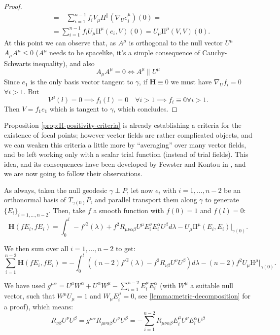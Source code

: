 \begin{proof}
\begin{align*}
		& = - \sum_{i = 1}^{n - 1}f_i V_{\mu}\Pi^{\parallel}\left(\nabla_Ue_i^{\mu}\right)(0) =\\
		& = \sum_{i = 1}^{n - 1}f_i U_{\mu}\mathrm{I\!I}^{\mu}(e_i, V)(0) = U_{\mu}\mathrm{I\!I}^{\mu}(V, V)(0).
	\end{align*}
	At this point we can observe that, as \(A^{\mu}\) is orthogonal to the null vector \(U^{\mu}\) \(A_{\mu}A^{\mu} \le 0\) (\(A^{\mu}\) needs to be spacelike, it's a simple consequence of Cauchy-Schwarts inequality), and also
	\[
	A_{\mu}A^{\mu} = 0 \iff A^{\mu}\parallel U^{\mu}
	\]
	Since \(e_1\) is the only basis vector tangent to \(\gamma\), if \(\textbf{H} \equiv 0\) we must have \(\nabla_Uf_i = 0\) \(\forall i > 1\). But
	\[
	V^{\mu}(l) = 0 \implies f_i(l) = 0 \quad \forall i > 1 \implies f_i\equiv 0 \forall i > 1.
	\]
	Then \(V = f_1e_1\) which is tangent to \(\gamma\), which concludes.
\end{proof}

Proposition \ref{prop:H-positivity-criteria} is already establishing a criteria for the existence of focal points; however vector fields are rather complicated objects, and we can weaken this criteria a little more by ``averaging'' over many vector fields, and be left working only with a scalar trial function (instead of trial fields). This idea, and its consequences have been developed by Fewster and Kontou in \cite{fewster2020new}, and we are now going to follow their observations.

As always, taken the null geodesic \(\gamma\perp P\), let now \(e_i\) with \(i = 1, \ldots, n - 2\) be an orthonormal basis of \(T_{\gamma(0)}P\), and parallel transport them along \(\gamma\) to generate \(\{E_i\}_{i = 1, \ldots, n-2}\). Then, take \(f\) a smooth function with \(f(0) = 1\) and \(f(l) = 0\):
\begin{equation*}
	\textbf{H}(fE_i, fE_i) = \int_{0}^{l} -f'^2(\lambda) + f^2R_{\mu\nu\alpha\beta}U^{\mu}E_i^{\nu}E_i^{\alpha}U^{\beta} d\lambda- U_{\mu}\mathrm{I\!I}^{\mu}(E_i, E_i)\Big\vert_{\gamma(0)}.
\end{equation*}

We then sum over all \(i = 1, \ldots, n - 2\) to get:
\begin{equation}
	\label{eq:hessian-averagded}
	\sum_{i=1}^{n - 2}\textbf{H}(fE_i, fE_i) = - \int_{0}^{l} \left((n - 2)f'^2(\lambda) - f^2R_{\nu\beta}U^{\nu}U^{\beta}\right) d\lambda - (n - 2)f^2U_{\mu}\mathrm{H}^{\mu}\Big\vert_{\gamma(0)}.
\end{equation}

We have used \(g^{\mu\alpha} = U^{\mu}W^{\alpha} + U^{\alpha}W^{\mu} - \sum_{i=1}^{n - 2}E_i^{\mu}E_i^{\alpha}\) (with \(W^{\mu}\) a suitable null vector, such that \(W^{\mu}U_{\mu} = 1\) and \(W_{\mu}E_i^{\mu} = 0\), see \ref{lemma:metric-decomposition} for a proof), which means:
	\[
	R_{\nu\beta}U^{\nu}U^{\beta} = g^{\mu\alpha}R_{\mu\nu\alpha\beta}U^{\nu}U^{\beta} = - \sum_{i=1}^{n - 2}R_{\mu\nu\alpha\beta}E_i^{\mu}U^{\nu}E_i^{\alpha}U^{\beta}
	\]
	
